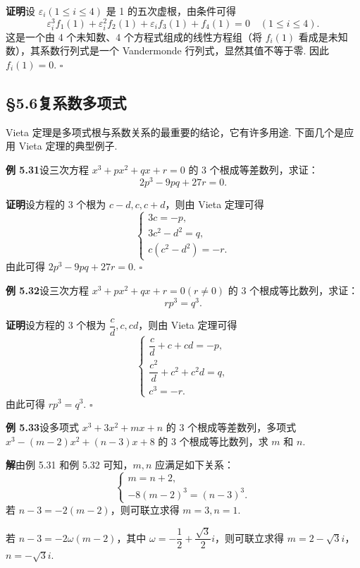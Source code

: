 \documentclass[UTF8,12pt,a4paper,fontset=fandol]{ctexart}
\begin{document}
\noindent\textbf{证明}\quad 设 $\varepsilon_i(1\le i\le4)$ 是 1 的五次虚根，由条件可得
\[
\varepsilon_i^3f_1(1)+\varepsilon_i^2f_2(1)+\varepsilon_i f_3(1)+f_4(1)=0\quad (1\le i\le4).
\]
这是一个由 4 个未知数、4 个方程式组成的线性方程组（将 $f_i(1)$ 看成是未知数），其系数行列式是一个 Vandermonde 行列式，显然其值不等于零. 因此 $f_i(1)=0$. \hfill $\square$

\subsection*{§5.6\quad 复系数多项式}

Vieta 定理是多项式根与系数关系的最重要的结论，它有许多用途. 下面几个是应用 Vieta 定理的典型例子.

\noindent\textbf{例 5.31}\quad 设三次方程 $x^3+px^2+qx+r=0$ 的 3 个根成等差数列，求证：
\[
2p^3-9pq+27r=0.
\]

\noindent\textbf{证明}\quad 设方程的 3 个根为 $c-d,c,c+d$，则由 Vieta 定理可得
\[
\left\{
\begin{array}{l}
3c=-p,\\
3c^2-d^2=q,\\
c(c^2-d^2)=-r.
\end{array}
\right.
\]
由此可得 $2p^3-9pq+27r=0$. \hfill $\square$

\noindent\textbf{例 5.32}\quad 设三次方程 $x^3+px^2+qx+r=0(r\ne0)$ 的 3 个根成等比数列，求证：
\[
rp^3=q^3.
\]

\noindent\textbf{证明}\quad 设方程的 3 个根为 $\dfrac{c}{d},c,cd$，则由 Vieta 定理可得
\[
\left\{
\begin{array}{l}
\dfrac{c}{d}+c+cd=-p,\\
\dfrac{c^2}{d}+c^2+c^2d=q,\\
c^3=-r.
\end{array}
\right.
\]
由此可得 $rp^3=q^3$. \hfill $\square$

\noindent\textbf{例 5.33}\quad 设多项式 $x^3+3x^2+mx+n$ 的 3 个根成等差数列，多项式 $x^3-(m-2)x^2+(n-3)x+8$ 的 3 个根成等比数列，求 $m$ 和 $n$.

\noindent\textbf{解}\quad 由例 5.31 和例 5.32 可知，$m,n$ 应满足如下关系：
\[
\left\{
\begin{array}{l}
m=n+2,\\
-8(m-2)^3=(n-3)^3.
\end{array}
\right.
\]
若 $n-3=-2(m-2)$，则可联立求得 $m=3,n=1$.

若 $n-3=-2\omega(m-2)$，其中 $\omega=-\dfrac12+\dfrac{\sqrt3}{2}i$，则可联立求得 $m=2-\sqrt3 i$，$n=-\sqrt3 i$.
\end{document}
